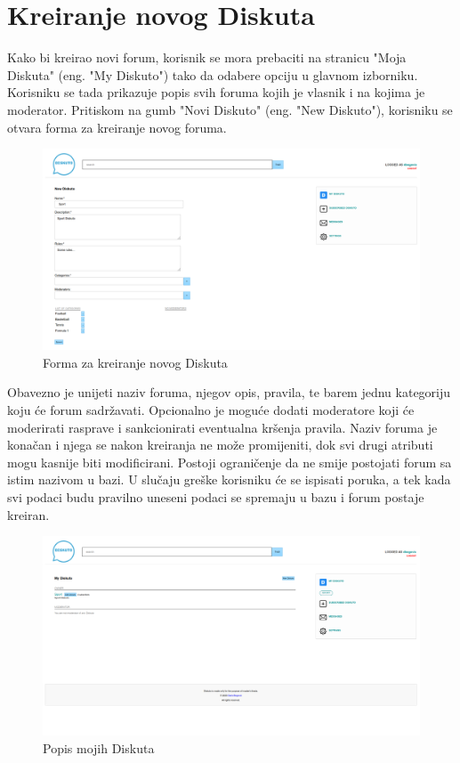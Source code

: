 \documentclass{foi}
\begin{document}
\section{Kreiranje novog Diskuta}

Kako bi kreirao novi forum, korisnik se mora prebaciti na stranicu "Moja Diskuta" (eng. "My Diskuto") tako da odabere opciju u glavnom izborniku. Korisniku se tada prikazuje popis svih foruma kojih je vlasnik i na kojima je moderator. Pritiskom na gumb "Novi Diskuto" (eng. "New Diskuto"), korisniku se otvara forma za kreiranje novog foruma.

\begin{figure}[h!]
    \centering
    \includegraphics[width=1\textwidth]{slike/novi-forum.png}
    \caption{Forma za kreiranje novog Diskuta}
\end{figure}

Obavezno je unijeti naziv foruma, njegov opis, pravila, te barem jednu kategoriju koju će forum sadržavati. Opcionalno je moguće dodati moderatore koji će moderirati rasprave i sankcionirati eventualna kršenja pravila. Naziv foruma je konačan i njega se nakon kreiranja ne može promijeniti, dok svi drugi atributi mogu kasnije biti modificirani. Postoji ograničenje da ne smije postojati forum sa istim nazivom u bazi. U slučaju greške korisniku će se ispisati poruka, a tek kada svi podaci budu pravilno uneseni podaci se spremaju u bazu i forum postaje kreiran.

\begin{figure}[h!]
    \centering
    \includegraphics[width=1\textwidth]{slike/moji-forumi.png}
    \caption{Popis mojih Diskuta}
\end{figure}
\end{document}
